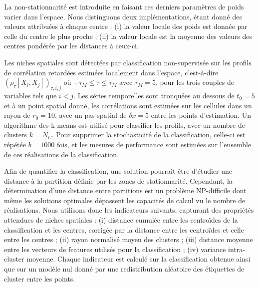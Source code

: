 \documentclass[11pt]{article}
\begin{document}

La non-stationnarité est introduite en faisant ces derniers paramètres de poids varier dans l'espace. Nous distinguons deux implémentations, étant donné des valeurs attribuées à chaque centre : (i) la valeur locale des poids est donnée par celle du centre le plus proche ; (ii) la valeur locale est la moyenne des valeurs des centres pondérée par les distances à ceux-ci.

Les niches spatiales sont détectées par classification non-supervisée sur les profils de corrélation retardées estimées localement dans l'espace, c'est-à-dire $(\rho_{\tau}\left[X_i,X_j\right])_{\tau,i,j}$ où $- \tau_M \leq \tau \leq  \tau_M$ avec $\tau_M = 5$, pour les trois couples de variables tels que $i < j$. Les séries temporelles sont tronquées au dessous de $t_0 = 5$ et à un point spatial donné, les corrélations sont estimées sur les cellules dans un rayon de $r_0 = 10$, avec un pas spatial de $\delta x = 5$ entre les points d'estimation. Un algorithme des k-means est utilisé pour classifier les profils, avec un nombre de clusters $k = N_C$. Pour supprimer la stochasticité de la classification, celle-ci est répétée $b = 1000$ fois, et les mesures de performance sont estimées sur l'ensemble de ces réalisations de la classification.

Afin de quantifier la classification, une solution pourrait être d'étudier une distance à la partition définie par les zones de stationnarité. Cependant, la détermination d'une distance entre partitions est un problème NP-difficile \citep{day1981complexity} dont même les solutions optimales \citep{porumbel2011efficient} dépassent les capacités de calcul vu le nombre de réalisations. Nous utilisons donc les indicateurs suivants, capturant des propriétés attendues de niches spatiales : (i) distance cumulée entre les centroïdes de la classification et les centres, corrigée par la distance entre les centroïdes et celle entre les centres %
 ; (ii) rayon normalisé moyen des clusters ; (iii) distance moyenne entre les vecteurs de features utilisés pour la classification ; (iv) variance intra-cluster moyenne. Chaque indicateur est calculé sur la classification obtenue ainsi que sur un modèle nul donné par une redistribution aléatoire des étiquettes de cluster entre les points.
 
\end{document}
